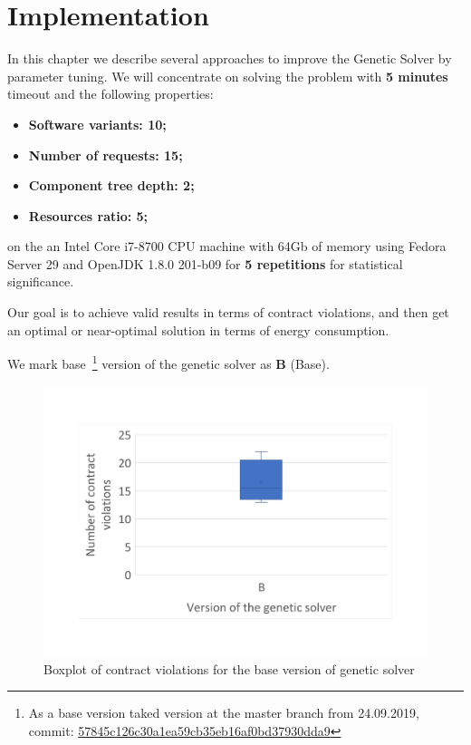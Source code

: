\chapter{Implementation}\label{chapter:Implementation}

In this chapter we describe several approaches to improve the Genetic Solver by parameter tuning.
We will concentrate on solving the problem with \textbf{5 minutes} timeout and the following properties:
\begin{itemize}
	\item \textbf{Software variants: 10;}
	\item \textbf{Number of requests: 15;}
	\item \textbf{Component tree depth: 2;}
	\item \textbf{Resources ratio: 5;}
\end{itemize}
on the an Intel Core i7-8700 CPU machine with 64Gb of memory using Fedora Server 29 and OpenJDK 1.8.0 201-b09 for \textbf{5 repetitions} for statistical significance.

Our goal is to achieve valid results in terms of contract violations, and then get an optimal or near-optimal solution in terms of energy consumption. 

We mark base~\footnote{As a base version taked version at the master branch from 24.09.2019, commit: \href{https://git-st.inf.tu-dresden.de/mquat/mquat2/commit/57845c126c30a1ea59cb35eb16af0bd37930dda9}{57845c126c30a1ea59cb35eb16af0bd37930dda9}} version of the genetic solver as \textbf{B} (Base).


\begin{figure}
	\centering
	\includegraphics[width=\textwidth]{images/BoxPlotSolverBasic}
	\caption[Boxplot of contract violations for the base version of genetic solver]{Boxplot of contract violations for the base version of genetic solver}
	\label{fig:boxplotsolverbasic}
\end{figure}


